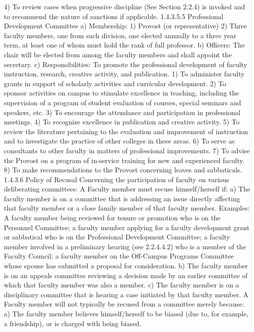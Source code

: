 \documentclass[letterpaper, 11pt]{article}
\begin{document}
4) To review cases when progressive discipline (See Section 2.2.4) is invoked and to recommend the nature of sanctions if applicable.
1.4.3.5.5 Professional Development Committee
a) Membership:
1) Provost (or representative)
2) Three faculty members, one from each division, one elected annually to a three year term, at least one of whom must hold the rank of full professor.
b) Officers:
   The chair will be elected from among the faculty members and shall appoint the secretary.
c) Responsibilities:
   To promote the professional development of faculty instruction, research, creative activity, and publication.
1) To administer faculty grants in support of scholarly activities and curricular development.
2) To sponsor activities on campus to stimulate excellence in teaching, including the supervision of a program of student evaluation of courses, special seminars and speakers, etc.
3) To encourage the attendance and participation in professional meetings.
4) To recognize excellence in publication and creative activity.
5) To review the literature pertaining to the evaluation and improvement of instruction and to investigate the practice of other colleges in these areas.
6) To serve as consultants to other faculty in matters of professional improvements.
7) To advise the Provost on a program of in-service training for new and experienced faculty.
8) To make recommendations to the Provost concerning leaves and sabbaticals.
1.4.3.6 Policy of Recusal
   Concerning the participation of faculty on various deliberating committees:  A Faculty member must recuse himself/herself if:
a) The faculty member is on a committee that is addressing an issue directly affecting that faculty member or a close family member of that faculty member.  Examples: A faculty member being reviewed for tenure or promotion who is on the Personnel Committee; a faculty member applying for a faculty development grant or sabbatical who is on the Professional Development Committee; a faculty member involved in a preliminary hearing (see 2.2.4.4.2) who is a member of the Faculty Council; a faculty member on the Off-Campus Programs Committee whose spouse has submitted a proposal for consideration.
b) The faculty member is on an appeals committee reviewing a decision made by an earlier committee of which that faculty member was also a member.
c) The faculty member is on a disciplinary committee that is hearing a case initiated by that faculty member.
   A Faculty member will not typically be recused from a committee merely because:
a) The faculty member believes himself/herself to be biased (due to, for example, a  friendship), or is charged with being biased.
\end{document}
